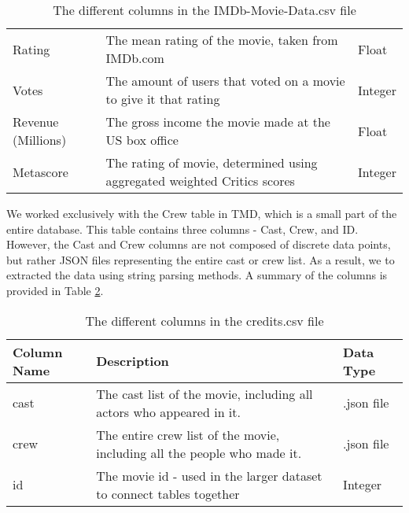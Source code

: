\begin{table}[h]
\begin{tabular}{lp{10cm}l}
                Rating             & The mean rating of the movie, taken from IMDb.com                          & Float     \\
                Votes              & The amount of users that voted on a movie to give it that rating           & Integer   \\
                Revenue (Millions) & The gross income the movie made at the US box office                       & Float     \\
                Metascore          & The rating of movie, determined using aggregated weighted Critics scores   & Integer   \\
                \bottomrule
            \end{tabular}
            \caption[short]{The different columns in the IMDb-Movie-Data.csv file}\label{tab-IMDb-Movie-Data-Column-Description}
        \end{table}

        We worked exclusively with the Crew table in TMD, which is a small part of the
            entire database.
        This table contains three columns - Cast, Crew, and ID.
        However, the Cast and Crew columns are not composed of discrete data points,
            but rather JSON files representing the entire cast or crew list.
        As a result, we to extracted the data using string parsing methods.
        A summary of the columns is provided in Table
            \ref*{tab-Credits-Column-Description}.
        \begin{table}[h]
            \centering
            \begin{tabular}{lp{10cm}l}
                \toprule
                Column Name & Description                                                              & Data Type  \\
                \midrule
                cast        & The cast list of the movie, including all actors who appeared in it.     & .json file \\
                crew        & The entire crew list of the movie, including all the people who made it. & .json file \\
                id          & The movie id - used in the larger dataset to connect tables together     & Integer    \\
                \bottomrule
            \end{tabular}
            \caption[short]{The different columns in the credits.csv file}\label{tab-Credits-Column-Description}
        \end{table}


